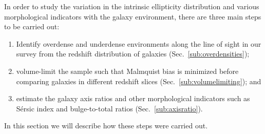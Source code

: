 \documentclass[twocolumn,useAMS,usenatbib]{mn2e}
\newcommand{\rachel}[1]{{\textcolor{red}{#1}}}
\newcommand{\sersic}{S\'{e}rsic }
\begin{document}
In order to study the variation in the intrinsic ellipticity
distribution and various morphological indicators with the galaxy environment, there are three main steps to be carried out:
\begin{enumerate}
 \item Identify overdense and underdense environments along the line of sight in our survey
   from the redshift distribution of galaxies (Sec.~\ref{sub:overdensities});
 \item volume-limit the sample such that Malmquist bias is minimized
   before comparing galaxies in different redshift slices
   (Sec.~\ref{sub:volumelimiting}); and 
 \item estimate the galaxy axis ratios and other morphological indicators such as  \sersic index and bulge-to-total ratios (Sec.~\ref{sub:axisratio}).
\end{enumerate}

In this section we will describe how these steps were carried out.

\end{document}
